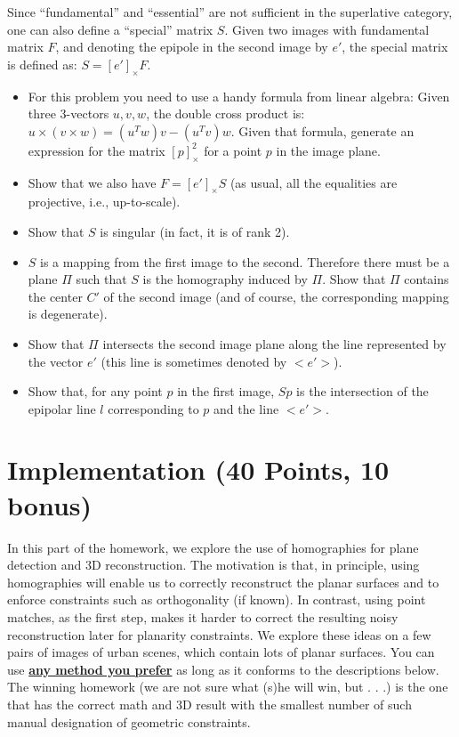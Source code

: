 \documentclass[11pt]{article}
\begin{document}
Since ``fundamental'' and ``essential'' are not sufficient in the superlative category, one can also define 
a ``special'' matrix $S$. Given two images with fundamental matrix $F$, and denoting the epipole in the second image by
$e'$, the special matrix is defined as: $S = [e']_{\times}F$. 
\begin{itemize}

\item For this problem you need to use a handy formula from linear algebra: Given three 3-vectors $u,v,w$, the 
double cross product is: $u \times (v \times w) = (u^Tw)v - (u^Tv)w$. Given that formula, generate an expression 
for the matrix $[p]_{\times}^2$ for a point $p$ in the image plane.

\item Show that we also have $F = [e']_{\times}S$ (as usual, all the equalities are projective, i.e., up-to-scale).

\item Show that $S$ is singular (in fact, it is of rank 2).

\item $S$ is a mapping from the first image to the second. Therefore there must be a plane $\Pi$ such that $S$ 
is the homography induced by $\Pi$. Show that $\Pi$ contains the center $C'$ of the second image (and of course, the 
corresponding mapping is degenerate).

\item Show that $\Pi$ intersects the second image plane along the line represented by the vector $e'$ 
(this line is sometimes denoted by $<e'>$).

\item Show that, for any point $p$ in the first image, $Sp$ is the intersection of the epipolar line $l$ 
corresponding to $p$ and the line $<e'>$.

\end{itemize}

\section{Implementation (40 Points, 10 bonus)}
In this part of the homework, we explore the use of homographies for plane detection and 3D reconstruction. The motivation is that, in principle, using homographies will enable us to correctly reconstruct the planar surfaces and to enforce constraints such as orthogonality (if known). In contrast, using point matches, as the first step, makes it harder to correct the resulting noisy reconstruction later for planarity constraints. We explore these ideas on a few pairs of images of urban scenes, which
contain lots of planar surfaces. You can use \underline{{\bf any method you prefer}} as long as it conforms to the descriptions below. The winning homework (we are not sure what (s)he will win, but . . .) is the one that has the
correct math and 3D result with the smallest number of such manual designation of geometric constraints.
\end{document}
